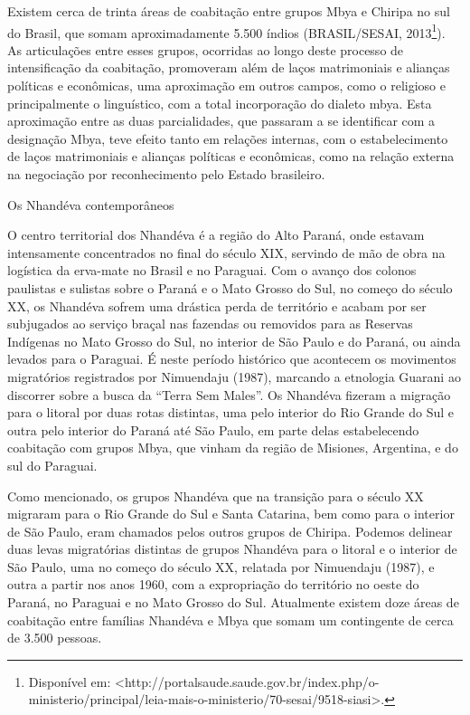 \documentclass{article}
\begin{document}
Existem cerca de trinta \'areas de coabita\c{c}\~ao entre grupos Mbya e
Chiripa no sul do Brasil, que somam aproximadamente 5.500 \'indios
(BRASIL/SESAI, 2013\footnote{ Dispon\'ivel em:
{\textless}http://portalsaude.saude.gov.br/index.php/o-ministerio/principal/leia-mais-o-ministerio/70-sesai/9518-siasi{\textgreater}.}).
As articula\c{c}\~oes entre esses grupos, ocorridas ao longo deste
processo de intensifica\c{c}\~ao da coabita\c{c}\~ao, promoveram al\'em
de la\c{c}os matrimoniais e alian\c{c}as pol\'iticas e econ\^omicas,
uma aproxima\c{c}\~ao em outros campos, como o religioso e
principalmente o lingu\'istico, com a total incorpora\c{c}\~ao do
dialeto mbya. Esta aproxima\c{c}\~ao entre as duas parcialidades, que
passaram a se identificar com a designa\c{c}\~ao Mbya, teve efeito
tanto em rela\c{c}\~oes internas, com o estabelecimento de la\c{c}os
matrimoniais e alian\c{c}as pol\'iticas e econ\^omicas, como na
rela\c{c}\~ao externa na negocia\c{c}\~ao por reconhecimento pelo
Estado brasileiro.

Os Nhand\'eva contempor\^aneos

O centro territorial dos Nhand\'eva \'e a regi\~ao do Alto Paran\'a,
onde estavam intensamente concentrados no final do s\'eculo XIX,
servindo de m\~ao de obra na log\'istica da erva-mate no Brasil e no
Paraguai. Com o avan\c{c}o dos colonos paulistas e sulistas sobre o
Paran\'a e o Mato Grosso do Sul, no come\c{c}o do s\'eculo XX, os
Nhand\'eva sofrem uma dr\'astica perda de territ\'orio e acabam por ser
subjugados ao servi\c{c}o bra\c{c}al nas fazendas ou removidos para as
Reservas Ind\'igenas no Mato Grosso do Sul, no interior de S\~ao Paulo
e do Paran\'a, ou ainda levados para o Paraguai. \'E neste per\'iodo
hist\'orico que acontecem os movimentos migrat\'orios registrados por
Nimuendaju (1987), marcando a etnologia Guarani ao discorrer sobre a
busca da {\textquotedblleft}Terra Sem Males{\textquotedblright}. Os
Nhand\'eva fizeram a migra\c{c}\~ao para o litoral por duas rotas
distintas, uma pelo interior do Rio Grande do Sul e outra pelo interior
do Paran\'a at\'e S\~ao Paulo, em parte delas estabelecendo
coabita\c{c}\~ao com grupos Mbya, que vinham da regi\~ao de Misiones,
Argentina, e do sul do Paraguai.

Como mencionado, os grupos Nhand\'eva que na transi\c{c}\~ao para o
s\'eculo XX migraram para o Rio Grande do Sul e Santa Catarina, bem
como para o interior de S\~ao Paulo, eram chamados pelos outros grupos
de Chiripa. Podemos delinear duas levas migrat\'orias distintas de
grupos Nhand\'eva para o litoral e o interior de S\~ao Paulo, uma no
come\c{c}o do s\'eculo XX, relatada por Nimuendaju (1987), e outra a
partir nos anos 1960, com a expropria\c{c}\~ao do territ\'orio no oeste
do Paran\'a, no Paraguai e no Mato Grosso do Sul. Atualmente existem
doze \'areas de coabita\c{c}\~ao entre fam\'ilias Nhand\'eva e Mbya que
somam um contingente de cerca de 3.500 pessoas.
\end{document}
